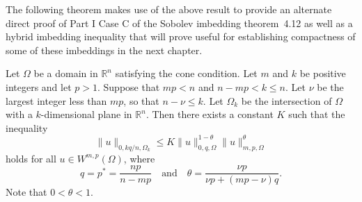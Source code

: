The following theorem makes use of the above result to provide an alternate
direct proof of Part I Case C of the Sobolev imbedding theorem~4.12 as well
as a hybrid imbedding inequality that will prove useful for establishing
compactness of some of these imbeddings in the next chapter.

\begin{theorem}
  Let $\Omega$ be a domain in $\mathbb{R}^n$ satisfying the cone condition.
  Let $m$ and $k$ be positive integers and let $p>1$. Suppose that $mp<n$
  and $n-mp<k\leq n$. Let $\nu$ be the largest integer less than $mp$, so
  that $n-\nu\leq k$. Let $\Omega_k$ be the intersection of $\Omega$ with
  a $k$-dimensional plane in $\mathbb{R}^n$. Then there exists a constant
  $K$ such that the inequality
  \begin{equation}\label{eq:5.15}
    \|u\|_{0,kq/n,\Omega_k} \leq K \|u\|_{0,q,\Omega}^{1-\theta}
      \|u\|_{m,p,\Omega}^\theta
  \end{equation}
  holds for all $u\in W^{m,p}(\Omega)$, where
  \[ q = p^* = \frac{np}{n-mp} \quad \text{and} \quad
      \theta = \frac{\nu p}{\nu p + (mp-\nu)q}. \]
  Note that $0<\theta<1$.
\end{theorem}

